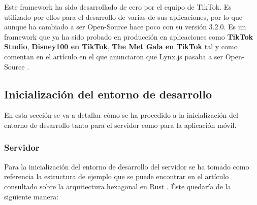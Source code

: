 Este framework ha sido desarrollado de cero por el equipo de TikTok. Es utilizado por ellos para el desarrollo de varias de sus aplicaciones, por lo que aunque ha cambiado a ser Open-Source hace poco con su versión 3.2.0. Es un framework que ya ha sido probado en producción en aplicaciones como \textbf{TikTok Studio}, \textbf{Disney100 en TikTok}, \textbf{The Met Gala en TikTok} tal y como comentan en el artículo en el que anunciaron que Lynx.js pasaba a ser Open-Source \parencite{lynx-article}.

\subsection{Inicialización del entorno de desarrollo}
En esta sección se va a detallar cómo se ha procedido a la inicialización del entorno de desarrollo tanto para el servidor como para la aplicación móvil.
\subsubsection{Servidor}
Para la inicialización del entorno de desarrollo del servidor se ha tomado como referencia la estructura de ejemplo que se puede encontrar en el artículo consultado sobre la arquitectura hexagonal en Rust \parencite{rust-hexagonal-architecture}. Éste quedaría de la siguiente manera:

